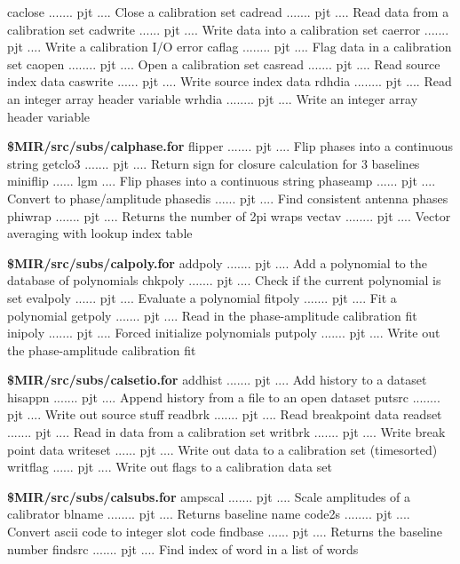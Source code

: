 {\eightpoint\begintt
caclose ....... pjt .... Close a calibration set
cadread ....... pjt .... Read data from a calibration set
cadwrite ...... pjt .... Write data into a calibration set
caerror ....... pjt .... Write a calibration I/O error
caflag ........ pjt .... Flag data in a calibration set
\endtt}
{\eightpoint\begintt
caopen ........ pjt .... Open a calibration set
casread ....... pjt .... Read source index data
caswrite ...... pjt .... Write source index data
rdhdia ........ pjt .... Read an integer array header variable
wrhdia ........ pjt .... Write an integer array header variable
\endtt}
\par{\bf \$MIR/src/subs/calphase.for}
{\eightpoint\begintt
flipper ....... pjt .... Flip phases into a continuous string
getclo3 ....... pjt .... Return sign for closure calculation for 3 baselines
miniflip ...... lgm .... Flip phases into a continuous string
phaseamp ...... pjt .... Convert to phase/amplitude
phasedis ...... pjt .... Find consistent antenna phases
\endtt}
{\eightpoint\begintt
phiwrap ....... pjt .... Returns the number of 2pi wraps
vectav ........ pjt .... Vector averaging with lookup index table
\endtt}
\par{\bf \$MIR/src/subs/calpoly.for}
{\eightpoint\begintt
addpoly ....... pjt .... Add a polynomial to the database of polynomials
chkpoly ....... pjt .... Check if the current polynomial is set
evalpoly ...... pjt .... Evaluate a polynomial
fitpoly ....... pjt .... Fit a polynomial
getpoly ....... pjt .... Read in the phase-amplitude calibration fit
\endtt}
{\eightpoint\begintt
inipoly ....... pjt .... Forced initialize polynomials
putpoly ....... pjt .... Write out the phase-amplitude calibration fit
\endtt}
\par{\bf \$MIR/src/subs/calsetio.for}
{\eightpoint\begintt
addhist ....... pjt .... Add history to a dataset
hisappn ....... pjt .... Append history from a file to an open dataset
putsrc ........ pjt .... Write out source stuff
readbrk ....... pjt .... Read breakpoint data
readset ....... pjt .... Read in data from a calibration set
\endtt}
{\eightpoint\begintt
writbrk ....... pjt .... Write break point data
writeset ...... pjt .... Write out data to a calibration set (timesorted)
writflag ...... pjt .... Write out flags to a calibration data set
\endtt}
\par{\bf \$MIR/src/subs/calsubs.for}
{\eightpoint\begintt
ampscal ....... pjt .... Scale amplitudes of a calibrator
blname ........ pjt .... Returns baseline name
code2s ........ pjt .... Convert ascii code to integer slot code
findbase ...... pjt .... Returns the baseline number
findsrc ....... pjt .... Find index of word in a list of words
\endtt}
